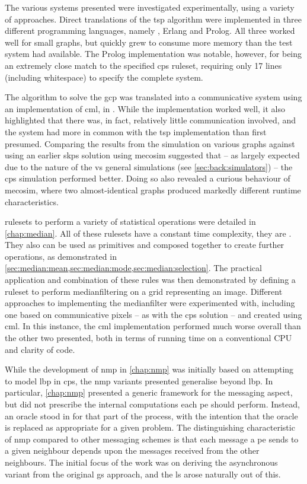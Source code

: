 The various systems presented were investigated experimentally, using a variety of approaches.  Direct translations of the \gls{tsp} algorithm were implemented in three different programming languages, namely \fsharp{}, Erlang and Prolog.  All three worked well for small graphs, but quickly grew to consume more memory than the test system had available.  The Prolog implementation was notable, however, for being an extremely close match to the specified \gls{cps} \gls{ruleset}, requiring only 17 lines (including whitespace) to specify the complete system.

The algorithm to solve the \gls{gcp} was translated into a communicative system using an implementation of \gls{cml}, \hopac{} in \fsharp{}.  While the implementation worked well, it also highlighted that there was, in fact, relatively little communication involved, and the system had more in common with the \gls{tsp} implementation than first presumed.  Comparing the results from the simulation on various graphs against using an earlier \gls{skps} solution using \gls{mecosim} suggested that -- as largely expected due to the nature of the \adhoc{} vs general simulations (see \vref{sec:back:simulators}) -- the \gls{cps} simulation performed better.  Doing so also revealed a curious behaviour of \gls{mecosim}, where two almost-identical graphs produced markedly different runtime characteristics.

\Glspl{ruleset} to perform a variety of statistical operations were detailed in \cref{chap:median}.  All of these \glspl{ruleset} have a constant time complexity, \ie{} they are .  They also can be used as primitives and composed together to create further operations, as demonstrated in \eg{} \cref{sec:median:mean,sec:median:mode,sec:median:selection}.  The practical application and combination of these rules was then demonstrated by defining a \gls{ruleset} to perform \gls{medianfilter}ing on a grid representing an image.  Different approaches to implementing the \gls{medianfilter} were experimented with, including one based on communicative pixels -- as with the \gls{cps} solution -- and created using \gls{cml}.  In this instance, the \gls{cml} implementation performed much worse overall than the other two presented, both in terms of running time on a conventional CPU and clarity of code.

While the development of \gls{nmp} in \cref{chap:nmp} was initially based on attempting to model \gls{lbp} in \gls{cps}, the \gls{nmp} variants presented generalise beyond \gls{lbp}.  In particular, \cref{chap:nmp} presented a generic framework for the messaging aspect, but did not prescribe the internal computations each \gls{pe} should perform.  Instead, an oracle stood in for that part of the process, with the intention that the oracle is replaced as appropriate for a given problem.  The distinguishing characteristic of \gls{nmp} compared to other messaging schemes is that each message a \gls{pe} sends to a given neighbour depends upon the messages received from the other neighbours.  The initial focus of the work was on deriving the asynchronous variant from the original \gls{gs} approach, and the \gls{ls} arose naturally out of this.

